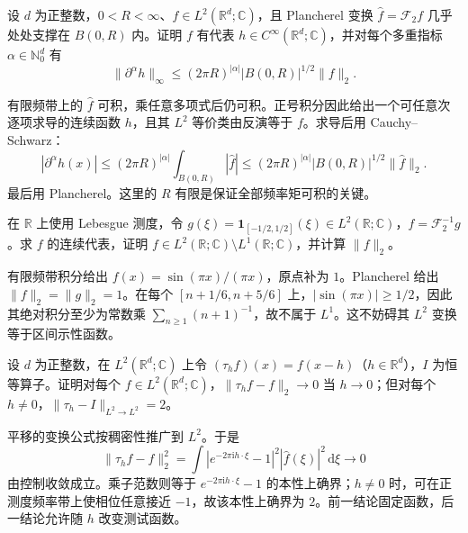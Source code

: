 \begin{exercise}\label{b2:ex:04-bandlimited}
设 \(d\) 为正整数，\(0<R<\infty\)、\(f\in L^2(\mathbb R^d;\mathbb C)\)，且 Plancherel 变换 \(\widehat f=\mathcal F_2f\) 几乎处处支撑在 \(B(0,R)\) 内。证明 \(f\) 有代表 \(h\in C^\infty(\mathbb R^d;\mathbb C)\)，并对每个多重指标 \(\alpha\in\mathbb N_0^d\) 有
\[
 \|\partial^\alpha h\|_\infty
 \leq(2\pi R)^{|\alpha|}|B(0,R)|^{1/2}\|f\|_2.
\]
\end{exercise}
\begin{solution}
有限频带上的 \(\widehat f\) 可积，乘任意多项式后仍可积。正号积分因此给出一个可任意次逐项求导的连续函数 \(h\)，且其 \(L^2\) 等价类由反演等于 \(f\)。求导后用 Cauchy--Schwarz：
\[
 |\partial^\alpha h(x)|
 \leq(2\pi R)^{|\alpha|}\int_{B(0,R)}|\widehat f|
 \leq(2\pi R)^{|\alpha|}|B(0,R)|^{1/2}\|\widehat f\|_2.
\]
最后用 Plancherel。这里的 \(R\) 有限是保证全部频率矩可积的关键。
\end{solution}

\begin{exercise}\label{b2:ex:04-sinc}
在 \(\mathbb R\) 上使用 Lebesgue 测度，令 \(g(\xi)=\mathbf1_{[-1/2,1/2]}(\xi)\in L^2(\mathbb R;\mathbb C)\)，\(f=\mathcal F_2^{-1}g\)。求 \(f\) 的连续代表，证明 \(f\in L^2(\mathbb R;\mathbb C)\setminus L^1(\mathbb R;\mathbb C)\)，并计算 \(\|f\|_2\)。
\end{exercise}
\begin{solution}
有限频带积分给出 \(f(x)=\sin(\pi x)/(\pi x)\)，原点补为 \(1\)。Plancherel 给出 \(\|f\|_2=\|g\|_2=1\)。在每个 \([n+1/6,n+5/6]\) 上，\(|\sin(\pi x)|\geq1/2\)，因此其绝对积分至少为常数乘 \(\sum_{n\geq1}(n+1)^{-1}\)，故不属于 \(L^1\)。这不妨碍其 \(L^2\) 变换等于区间示性函数。
\end{solution}

\begin{exercise}\label{b2:ex:04-translation-operator}
设 \(d\) 为正整数，在 \(L^2(\mathbb R^d;\mathbb C)\) 上令 \((\tau_hf)(x)=f(x-h)\)（\(h\in\mathbb R^d\)），\(I\) 为恒等算子。证明对每个 \(f\in L^2(\mathbb R^d;\mathbb C)\)，\(\|\tau_hf-f\|_2\to0\) 当 \(h\to0\)；但对每个 \(h\ne0\)，\(\|\tau_h-I\|_{L^2\to L^2}=2\)。
\end{exercise}
\begin{solution}
平移的变换公式按稠密性推广到 \(L^2\)。于是
\[
 \|\tau_hf-f\|_2^2
 =\int|e^{-2\pi\mathrm{i}h\cdot\xi}-1|^2|\widehat f(\xi)|^2\,\mathrm{d}\xi\longrightarrow0
\]
由控制收敛成立。乘子范数则等于 \(e^{-2\pi\mathrm{i}h\cdot\xi}-1\) 的本性上确界；\(h\ne0\) 时，可在正测度频率带上使相位任意接近 \(-1\)，故该本性上确界为 \(2\)。前一结论固定函数，后一结论允许随 \(h\) 改变测试函数。
\end{solution}

